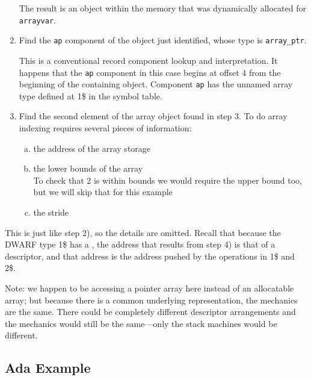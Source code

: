 \begin{enumerate}[1. ]
The result is an object within the memory that was dynamically
allocated for \texttt{arrayvar}.

\item  Find the \texttt{ap} component of the object just identified,
whose type is \texttt{array\_ptr}.

This is a conventional record component lookup and
interpretation. It happens that the \texttt{ap} component in this case
begins at offset 4 from the beginning of the containing object.
Component \texttt{ap} has the unnamed array type defined at 1\$ in the
symbol table.

\item  Find the second element of the array object found in step 3. To do array indexing requires
several pieces of information:
\begin{enumerate}[a) ]
\item  the address of the array storage

\item  the lower bounds of the array \\
\lbrack To check that 2 is within bounds we would require the upper
bound too, but we will skip that for this example \rbrack

\item  the stride

\end{enumerate}
\end{enumerate}

This is just like step 2), so the details are omitted. Recall
that because the DWARF type 1\$ has a ,
the address that results from step 4) is that of a
descriptor, and that address is the address pushed by the
 operations in 1\$ and 2\$.

Note: we happen to be accessing a pointer array here instead
of an allocatable array; but because there is a common
underlying representation, the mechanics are the same. There
could be completely different descriptor arrangements and the
mechanics would still be the same---only the stack machines
would be different.



\subsection{Ada Example}
\label{app:adaexample}

